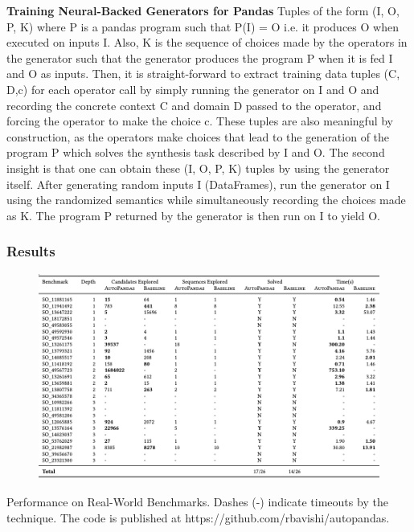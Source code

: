 \documentclass{article}
\begin{document}
\textbf{Training Neural-Backed Generators for Pandas} Tuples of the form (I, O, P, K) where P is a pandas program such that P(I) = O i.e. it produces O when executed on inputs I. Also, K is the sequence of choices made by the operators in the generator such that the generator produces the program P when it is fed I and O as inputs. Then, it is straight-forward to extract training data tuples (C, D,c) for each operator call by simply running the generator on I and O and recording the concrete context C and domain D passed to the operator, and forcing the operator to make the choice c. These tuples are also meaningful by construction, as the operators make choices that lead to the generation of the program P which solves the synthesis task described by I and O. The second insight is that one can obtain these (I, O, P, K) tuples by using the generator itself. After generating random inputs I (DataFrames), run the generator on I using the randomized semantics while simultaneously recording the choices made as K. The program P returned by the generator is then run on I to yield O.

\subsubsection{Results}
\begin{figure}[ht]
\vskip 0.2in
\begin{center}
\centerline{\includegraphics[width=\columnwidth]{Images/Synthesis3-3.png}}
\label{icml-historical}
\end{center}
\vskip -0.2in
\end{figure}
Performance on Real-World Benchmarks. Dashes (-) indicate timeouts by the technique. The code is published at https://github.com/rbavishi/autopandas.
\end{document}
